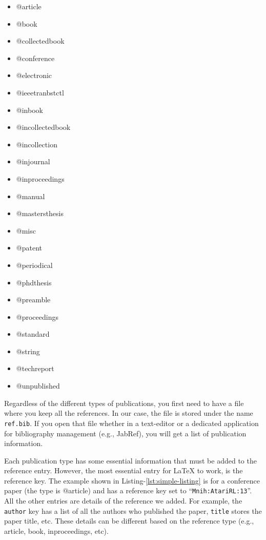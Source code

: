 \begin{itemize}
    \item @article
    \item @book
    \item @collectedbook
    \item @conference
    \item @electronic
    \item @ieeetranbstctl
    \item @inbook
    \item @incollectedbook
    \item @incollection
    \item @injournal
    \item @inproceedings
    \item @manual
    \item @mastersthesis
    \item @misc
    \item @patent
    \item @periodical
    \item @phdthesis
    \item @preamble
    \item @proceedings
    \item @standard
    \item @string
    \item @techreport
    \item @unpublished
\end{itemize}

Regardless of the different types of publications, you first need to have a file where you keep all the references. In our case, the file is stored under the name \texttt{ref.bib}. If you open that file whether in a text-editor or a dedicated application for bibliography management (e.g., JabRef), you will get a list of publication information. 

Each publication type has some essential information that must be added to the reference entry. However, the most essential entry for {\LaTeX} to work, is the reference key. The example shown in Listing-\ref{lst:simple-listing} is for a conference paper (the type is @article) and has a reference key set to ``\texttt{Mnih:AtariRL:13}''. All the other entries are details of the reference we added. For example, the \verb|author| key has a list of all the authors who published the paper, \verb|title| stores the paper title, etc. These details can be different based on the reference type (e.g., article, book, inproceedings, etc). 

